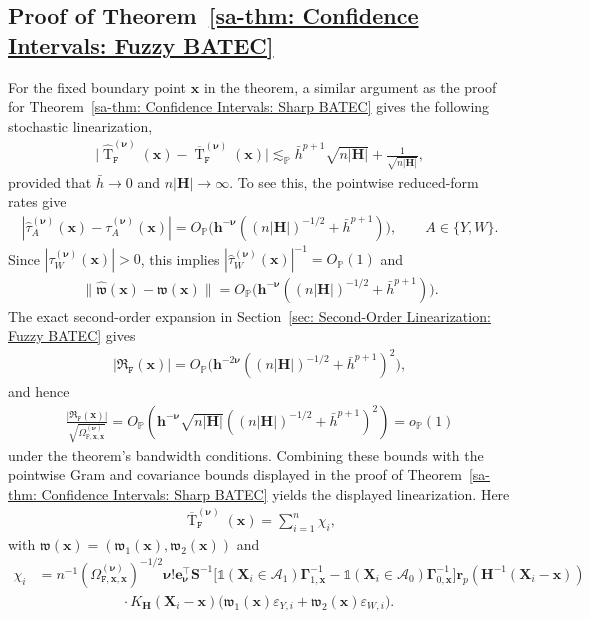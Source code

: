 \documentclass[10pt]{article}
\DeclareMathOperator{\Tstat}{T}
\renewcommand{\P}{\mathbb{P}}
\newcommand{\Indicator}{\mathds{1}}
\newcommand{\lessp}{\lesssim_{\mathbb{P}}}
\newcommand{\be}{\mathbf{e}}
\newcommand{\bh}{\mathbf{h}}
\newcommand{\bH}{\mathbf{H}}
\newcommand{\br}{\mathbf{r}}
\newcommand{\bS}{\mathbf{S}}
\newcommand{\bx}{\mathbf{x}}
\newcommand{\bX}{\mathbf{X}}
\newcommand{\bnu}{\boldsymbol{\nu}}
\newcommand{\bGamma}{\boldsymbol{\Gamma}}
\newcommand{\A}{\mathcal{A}}
\begin{document}
\subsection{Proof of Theorem~\ref{sa-thm: Confidence Intervals: Fuzzy BATEC}}
For the fixed boundary point $\bx$ in the theorem, a similar argument as the proof for Theorem~\ref{sa-thm: Confidence Intervals: Sharp BATEC} gives the following stochastic linearization,
\begin{align*}
    \Big|\widehat{\Tstat}_{\mathtt{F}}^{(\bnu)}(\bx) - \overline{\Tstat}_{\mathtt{F}}^{(\bnu)}(\bx)\Big|
    \lessp
    \bar{h}^{p+1}\sqrt{n |\bH|} + \frac{1}{\sqrt{n |\bH|}},
\end{align*}
provided that $\bar{h} \to 0$ and $n |\bH| \to \infty$. To see this, the pointwise reduced-form rates give
\begin{align*}
    |\widehat{\tau}_{A}^{(\bnu)}(\bx)-\tau_A^{(\bnu)}(\bx)|
    =O_{\P}\big(\bh^{-\bnu}((n|\bH|)^{-1/2}+\bar h^{p+1})\big),
    \qquad A\in\{Y,W\}.
\end{align*}
Since $|\tau_W^{(\bnu)}(\bx)|>0$, this implies $|\widehat{\tau}_W^{(\bnu)}(\bx)|^{-1}=O_{\P}(1)$ and
\begin{align*}
    \|\widehat{\mathfrak w}(\bx)-\mathfrak w(\bx)\|
    =O_{\P}\big(\bh^{-\bnu}((n|\bH|)^{-1/2}+\bar h^{p+1})\big).
\end{align*}
The exact second-order expansion in Section~\ref{sec: Second-Order Linearization: Fuzzy BATEC} gives
\begin{align*}
    |\mathfrak R_{\mathtt F}(\bx)|
    =O_{\P}\big(\bh^{-2\bnu}((n|\bH|)^{-1/2}+\bar h^{p+1})^2\big),
\end{align*}
and hence
\begin{align*}
    \frac{|\mathfrak R_{\mathtt F}(\bx)|}{\sqrt{\Omega_{\mathtt F,\bx,\bx}^{(\bnu)}}}
    =O_{\P}\!\left(
        \bh^{-\bnu}\sqrt{n|\bH|}
        ((n|\bH|)^{-1/2}+\bar h^{p+1})^2
      \right)=o_{\P}(1)
\end{align*}
under the theorem's bandwidth conditions. Combining these bounds with the pointwise Gram and covariance bounds displayed in the proof of Theorem~\ref{sa-thm: Confidence Intervals: Sharp BATEC} yields the displayed linearization. Here
\begin{align*}
    \overline{\Tstat}_{\mathtt{F}}^{(\bnu)}(\bx) = \sum_{i=1}^n \chi_i,
\end{align*}
with $\mathfrak{w}(\bx) = (\mathfrak{w}_1(\bx), \mathfrak{w}_2(\bx))$ and
\begin{align*}
    \chi_i
    &= n^{-1} (\Omega_{\mathtt{F}, \bx,\bx}^{(\bnu)})^{-1/2}
    \bnu!\be_{\bnu}^{\top} \bS^{-1}
    \Big[\Indicator(\bX_i\in\A_1)\bGamma_{1,\bx}^{-1}-\Indicator(\bX_i\in\A_0)\bGamma_{0,\bx}^{-1}\Big]
    \br_p(\bH^{-1}(\bX_i - \bx))\\
    &\hspace{1in} \cdot K_{\bH}(\bX_i - \bx)
    \big(\mathfrak{w}_1(\bx) \varepsilon_{Y,i} + \mathfrak{w}_2(\bx) \varepsilon_{W,i}\big).
\end{align*}
\end{document}
